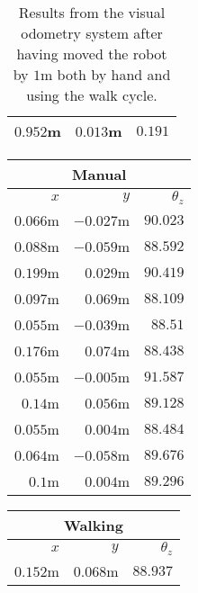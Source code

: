 \begin{appendices}
\begin{table}[!h]
\begin{tabular}{ r r r }
		\midrule
		$0.952$m &
		$0.013$m &
		$0.191$\textdegree{} \\
		\bottomrule
	\end{tabular}

	\caption{Results from the visual odometry system after having moved the robot by $1$m both by hand and using the walk cycle.}
	\label{tab:eval_vo}
\end{table}

\begin{table}[!h]
	\centering
	\begin{tabular}{ r r r }
		\toprule
		\multicolumn{3}{c}{\textbf{Manual}} \\
		\midrule
		\textbf{$x$} & \textbf{$y$} & \textbf{$\theta_z$} \\
		\midrule
		$0.066$m &
		$-0.027$m &
		$90.023$\textdegree{} \\

		$0.088$m &
		$-0.059$m &
		$88.592$\textdegree{} \\

		$0.199$m &
		$0.029$m &
		$90.419$\textdegree{} \\

		$0.097$m &
		$0.069$m &
		$88.109$\textdegree{} \\

		$0.055$m &
		$-0.039$m &
		$88.51$\textdegree{} \\

		$0.176$m &
		$0.074$m &
		$88.438$\textdegree{} \\

		$0.055$m &
		$-0.005$m &
		$91.587$\textdegree{} \\

		$0.14$m &
		$0.056$m &
		$89.128$\textdegree{} \\

		$0.055$m &
		$0.004$m &
		$88.484$\textdegree{} \\

		$0.064$m &
		$-0.058$m &
		$89.676$\textdegree{} \\

		\midrule
		$0.1$m &
		$0.004$m &
		$89.296$\textdegree{} \\
		\bottomrule
	\end{tabular}
	\hspace{2ex}
	\begin{tabular}{ r r r }
		\toprule
		\multicolumn{3}{c}{\textbf{Walking}} \\
		\midrule
		\textbf{$x$} & \textbf{$y$} & \textbf{$\theta_z$} \\
		\midrule
		$0.152$m &
		$0.068$m &
		$88.937$\textdegree{} \\


\end{tabular}
\end{table}
\end{appendices}
